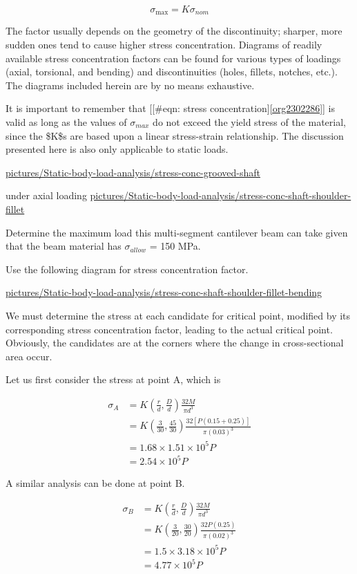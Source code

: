 \documentclass[a4paper,openany,12pt]{book}
\begin{document}
$$\sigma _{\max } = K\sigma _{nom}$$

The factor usually depends on the geometry of the discontinuity;
sharper, more sudden ones tend to cause higher stress concentration.
Diagrams of readily available stress concentration factors can be found
for various types of loadings (axial, torsional, and bending) and
discontinuities (holes, fillets, notches, etc.). The diagrams included
herein are by no means exhaustive.

It is important to remember that
[[\#eqn: stress concentration]\ref{org2302286}] is valid as
long as the values of \(\sigma_{max}\) do not exceed the yield stress of
the material, since the \$K\$s are based upon a linear stress-strain
relationship. The discussion presented here is also only applicable to
static loads.


\cite{juvinall2006fundamentals}
\url{pictures/Static-body-load-analysis/stress-conc-grooved-shaft}


under axial loading \cite{juvinall2006fundamentals}
\url{pictures/Static-body-load-analysis/stress-conc-shaft-shoulder-fillet}

Determine the maximum load this multi-segment cantilever beam can take
given that the beam material has \(\sigma_{allow}\) = 150 MPa.


Use the following diagram for stress concentration factor.


\url{pictures/Static-body-load-analysis/stress-conc-shaft-shoulder-fillet-bending}

We must determine the stress at each candidate for critical point,
modified by its corresponding stress concentration factor, leading to
the actual critical point. Obviously, the candidates are at the corners
where the change in cross-sectional area occur.

Let us first consider the stress at point A, which is

$$\begin{aligned}
    \sigma_A &= K(\frac{r}{d}, \frac{D}{d}) \frac{32M}{\pi d^3} \\
             &= K(\frac{3}{30}, \frac{45}{30}) \frac{32[P(0.15 + 0.25)]}{\pi (0.03)^3} \\
             &= 1.68 \times 1.51 \times 10^5 P \\
             &= 2.54 \times 10^5 P
  \end{aligned}$$

A similar analysis can be done at point B.

$$\begin{aligned}
    \sigma_B &= K(\frac{r}{d}, \frac{D}{d}) \frac{32M}{\pi d^3} \\
             &= K(\frac{3}{20}, \frac{30}{20}) \frac{32P(0.25)}{\pi (0.02)^3} \\
             &= 1.5 \times 3.18 \times 10^5 P \\
             &= 4.77 \times 10^5 P
  \end{aligned}$$
\end{document}
